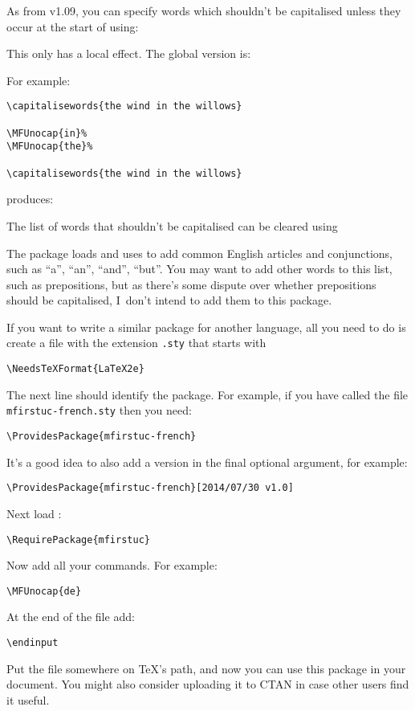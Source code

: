 \documentclass{nlctdoc}
\begin{document}
As from v1.09, you can specify words which shouldn't be capitalised unless they
occur at the start of  using:
\begin{definition}[\DescribeMacro]
\end{definition}
This only has a local effect. The global version is:
\begin{definition}[\DescribeMacro]
\end{definition}

For example:
\begin{verbatim}
\capitalisewords{the wind in the willows}

\MFUnocap{in}%
\MFUnocap{the}%

\capitalisewords{the wind in the willows}
\end{verbatim}
produces:
\begin{display}

%
%

\end{display}
The list of words that shouldn't be capitalised can be cleared using
\begin{definition}[\DescribeMacro\MFUclear]
\end{definition}

The package  loads  and uses
 to add common English articles and conjunctions, such
as ``a'', ``an'', ``and'', ``but''. You may want to add other
words to this list, such as prepositions, but as there's some
dispute over whether prepositions should be capitalised, I~don't
intend to add them to this package.

If you want to write a similar package for another language, all you
need to do is create a file with the extension \texttt{.sty}
that starts with
\begin{verbatim}
\NeedsTeXFormat{LaTeX2e}
\end{verbatim}
The next line should identify the package. For example, if you have
called the file \texttt{mfirstuc-french.sty} then you need:
\begin{verbatim}
\ProvidesPackage{mfirstuc-french}
\end{verbatim}
It's a good idea to also add a version in the final optional
argument, for example:
\begin{verbatim}
\ProvidesPackage{mfirstuc-french}[2014/07/30 v1.0]
\end{verbatim}
Next load :
\begin{verbatim}
\RequirePackage{mfirstuc}
\end{verbatim}
Now add all your  commands. For example:
\begin{verbatim}
\MFUnocap{de}
\end{verbatim}
At the end of the file add:
\begin{verbatim}
\endinput
\end{verbatim}

Put the file somewhere on \TeX's path, and now you can use this
package in your document. You might also consider uploading it
to CTAN in case other users find it useful.
\end{document}
